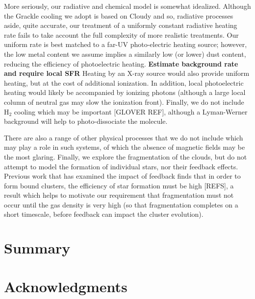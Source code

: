 \documentclass[useAMS,usenatbib]{mn2e}
\begin{document}
More seriously, our radiative and chemical model is somewhat idealized.  Although the {\sc Grackle} cooling we adopt is based on Cloudy and so, radiative processes aside, quite accurate, our treatment of a uniformly constant radiative heating rate fails to take account the full complexity of more realistic treatments.  Our uniform rate is best matched to a far-UV photo-electric heating source; however, the low metal content we assume implies a similarly low (or lower) dust content, reducing the efficiency of photoelectric heating. {\bf Estimate background rate and require local SFR}  Heating by an X-ray source would also provide uniform heating, but at the cost of additional ionization.  In addition, local photoelectric heating would likely be accompanied by ionizing photons (although a large local column of neutral gas may slow the ionization front).  Finally, we do not include H$_2$ cooling which may be important [GLOVER REF], although a Lyman-Werner background will help to photo-dissociate the molecule.

There are also a range of other physical processes that we do not include which may play a role in such systems, of which the absence of magnetic fields may be the most glaring.  Finally, we explore the fragmentation of the clouds, but do not attempt to model the formation of individual stars, nor their feedback effects.  Previous work that has examined the impact of feedback finds that in order to form bound clusters, the efficiency of star formation must be high [REFS], a result which helps to motivate our requirement that fragmentation must not occur until the gas density is very high (so that fragmentation completes on a short timescale, before feedback can impact the cluster evolution).

% 
\section{Summary}

% 
\section*{Acknowledgments}

%
\end{document}
